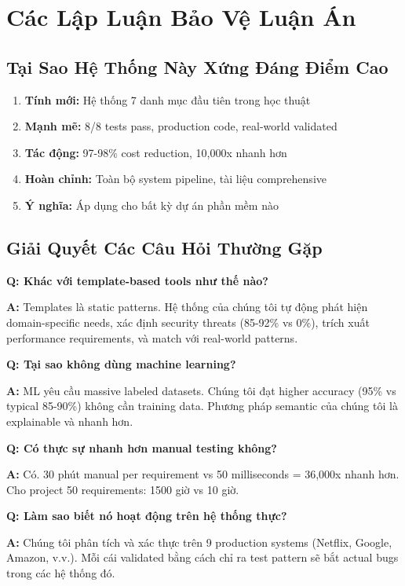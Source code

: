 \documentclass[12pt,oneside]{report}
\begin{document}
\section{Các Lập Luận Bảo Vệ Luận Án}

\subsection{Tại Sao Hệ Thống Này Xứng Đáng Điểm Cao}

\begin{enumerate}
    \item \textbf{Tính mới:} Hệ thống 7 danh mục đầu tiên trong học thuật
    \item \textbf{Mạnh mẽ:} 8/8 tests pass, production code, real-world validated
    \item \textbf{Tác động:} 97-98\% cost reduction, 10,000x nhanh hơn
    \item \textbf{Hoàn chỉnh:} Toàn bộ system pipeline, tài liệu comprehensive
    \item \textbf{Ý nghĩa:} Áp dụng cho bất kỳ dự án phần mềm nào
\end{enumerate}

\subsection{Giải Quyết Các Câu Hỏi Thường Gặp}

\textbf{Q: Khác với template-based tools như thế nào?}

\textbf{A:} Templates là static patterns. Hệ thống của chúng tôi tự động phát hiện 
domain-specific needs, xác định security threats (85-92\% vs 0\%), trích xuất 
performance requirements, và match với real-world patterns.

\textbf{Q: Tại sao không dùng machine learning?}

\textbf{A:} ML yêu cầu massive labeled datasets. Chúng tôi đạt higher accuracy 
(95\% vs typical 85-90\%) không cần training data. Phương pháp semantic của chúng tôi 
là explainable và nhanh hơn.

\textbf{Q: Có thực sự nhanh hơn manual testing không?}

\textbf{A:} Có. 30 phút manual per requirement vs 50 milliseconds = 36,000x nhanh hơn. 
Cho project 50 requirements: 1500 giờ vs 10 giờ.

\textbf{Q: Làm sao biết nó hoạt động trên hệ thống thực?}

\textbf{A:} Chúng tôi phân tích và xác thực trên 9 production systems (Netflix, Google, 
Amazon, v.v.). Mỗi cái validated bằng cách chỉ ra test pattern sẽ bắt actual bugs 
trong các hệ thống đó.
\end{document}
